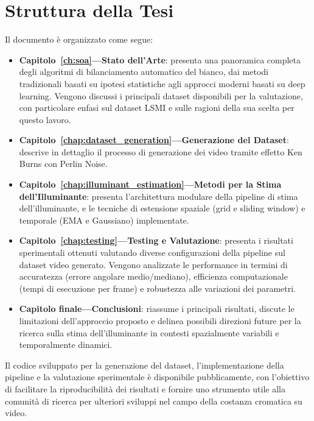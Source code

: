 \section{Struttura della Tesi}

Il documento è organizzato come segue:

\begin{itemize}
    \item \textbf{Capitolo~\ref{ch:soa}---Stato dell'Arte}: presenta una panoramica completa degli algoritmi di bilanciamento automatico del bianco, dai metodi tradizionali basati su ipotesi statistiche agli approcci moderni basati su deep learning. Vengono discussi i principali dataset disponibili per la valutazione, con particolare enfasi sul dataset LSMI e sulle ragioni della sua scelta per questo lavoro.

    \item \textbf{Capitolo~\ref{chap:dataset_generation}---Generazione del Dataset}: descrive in dettaglio il processo di generazione dei video tramite effetto Ken Burns con Perlin Noise.

    \item \textbf{Capitolo~\ref{chap:illuminant_estimation}---Metodi per la Stima dell'Illuminante}: presenta l'architettura modulare della pipeline di stima dell'illuminante, e le tecniche di estensione spaziale (grid e sliding window) e temporale (EMA e Gaussiano) implementate.

    \item \textbf{Capitolo~\ref{chap:testing}---Testing e Valutazione}: presenta i risultati sperimentali ottenuti valutando diverse configurazioni della pipeline sul dataset video generato. Vengono analizzate le performance in termini di accuratezza (errore angolare medio/mediano), efficienza computazionale (tempi di esecuzione per frame) e robustezza alle variazioni dei parametri.

    \item \textbf{Capitolo finale---Conclusioni}: riassume i principali risultati, discute le limitazioni dell'approccio proposto e delinea possibili direzioni future per la ricerca sulla stima dell'illuminante in contesti spazialmente variabili e temporalmente dinamici.
\end{itemize}

Il codice sviluppato per la generazione del dataset, l'implementazione della pipeline e la valutazione sperimentale è disponibile pubblicamente, con l'obiettivo di facilitare la riproducibilità dei risultati e fornire uno strumento utile alla comunità di ricerca per ulteriori sviluppi nel campo della costanza cromatica su video.

